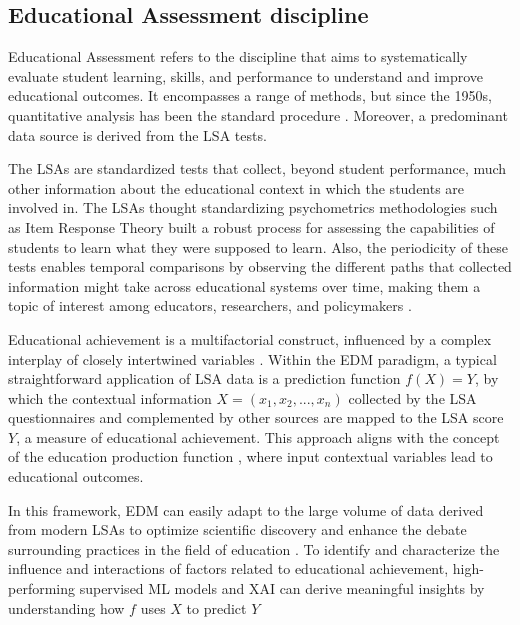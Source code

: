 \subsection{Educational Assessment discipline}

Educational Assessment refers to the discipline that aims to systematically evaluate student learning, skills, and performance to understand and improve educational outcomes. It encompasses a range of methods, but since the 1950s, quantitative analysis has been the standard procedure \cite{noah1969towards}. Moreover, a predominant data source is derived from the \gls{LSA} tests. 

The \gls{LSA}s are standardized tests that collect, beyond student performance, much other information about the educational context in which the students are involved in. The \gls{LSA}s thought standardizing psychometrics methodologies such as Item Response Theory built a robust process for assessing the capabilities of students to learn what they were supposed to learn. Also, the periodicity of these tests enables temporal comparisons by observing the different paths that collected information might take across educational systems over time, making them a topic of interest among educators, researchers, and policymakers \cite{Johansson2016InternationalConsequences, Kaplan2021BayesianNAEP}.


Educational achievement is a multifactorial construct, influenced by a complex interplay of closely intertwined variables \cite{MartinezAbad2017Data-miningAchievement}. Within the \gls{EDM} paradigm, a typical straightforward application of \gls{LSA} data is a prediction function \(f(X) = Y\), by which the contextual information \(X = (x_1, x_2, ..., x_n)\) collected by the \gls{LSA} questionnaires and complemented by other sources are mapped to the \gls{LSA} score \(Y\), a measure of educational achievement. This approach aligns with the concept of the education production function \cite{bowles1970towards, Scheerens1991ProcessEffectiveness}, where input contextual variables lead to educational outcomes.

In this framework, \gls{EDM} can easily adapt to the large volume of data derived from modern \gls{LSA}s to optimize scientific discovery and enhance the debate surrounding practices in the field of education \cite{Gabriel2018ALiteracy, Gomes2020StudentBrazil,Martinez-Abad2020EducationalAssessment, Lezhnina2022CombiningPISA, Martinez-Abad2018BigEducation}. To identify and characterize the influence and interactions of factors related to educational achievement, high-performing supervised \gls{ML} models and \gls{XAI} can derive meaningful insights by understanding how \(f\) uses \(X\) to predict \(Y\) \cite{Chen2021SynergisticLiteracy, Dong2019AnApproaches, Gorostiaga2016OnSpain, Hu2022DiscoveryApproach, Martinez-Abad2020EducationalAssessment} 

